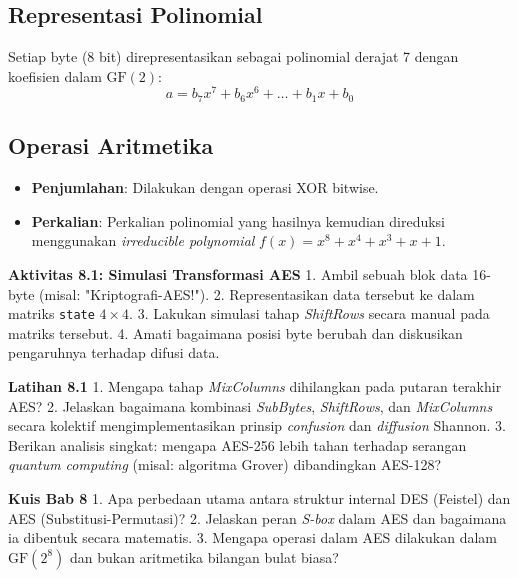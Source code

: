 \documentclass[../main.tex]{subfiles}
\begin{document}
\subsection{Representasi Polinomial}
Setiap byte (8 bit) direpresentasikan sebagai polinomial derajat 7 dengan koefisien dalam $\text{GF}(2)$:
\[ a = b_7x^7 + b_6x^6 + \dots + b_1x + b_0 \]

\subsection{Operasi Aritmetika}
\begin{itemize}
    \item \textbf{Penjumlahan}: Dilakukan dengan operasi XOR bitwise.
    \item \textbf{Perkalian}: Perkalian polinomial yang hasilnya kemudian direduksi menggunakan \textit{irreducible polynomial} $f(x) = x^8 + x^4 + x^3 + x + 1$.
\end{itemize}

\begin{obeactivity}
\textbf{Aktivitas 8.1: Simulasi Transformasi AES}
1. Ambil sebuah blok data 16-byte (misal: "Kriptografi-AES!").
2. Representasikan data tersebut ke dalam matriks \texttt{state} $4 \times 4$.
3. Lakukan simulasi tahap \textit{ShiftRows} secara manual pada matriks tersebut.
4. Amati bagaimana posisi byte berubah dan diskusikan pengaruhnya terhadap difusi data.
\end{obeactivity}

\begin{obereflection}
\textbf{Latihan 8.1}
1. Mengapa tahap \textit{MixColumns} dihilangkan pada putaran terakhir AES?
2. Jelaskan bagaimana kombinasi \textit{SubBytes}, \textit{ShiftRows}, dan \textit{MixColumns} secara kolektif mengimplementasikan prinsip \textit{confusion} dan \textit{diffusion} Shannon.
3. Berikan analisis singkat: mengapa AES-256 lebih tahan terhadap serangan \textit{quantum computing} (misal: algoritma Grover) dibandingkan AES-128?
\end{obereflection}

\begin{obeassessment}
\textbf{Kuis Bab 8}
1. Apa perbedaan utama antara struktur internal DES (Feistel) dan AES (Substitusi-Permutasi)?
2. Jelaskan peran \textit{S-box} dalam AES dan bagaimana ia dibentuk secara matematis.
3. Mengapa operasi dalam AES dilakukan dalam $\text{GF}(2^8)$ dan bukan aritmetika bilangan bulat biasa?
\end{obeassessment}
\end{document}
